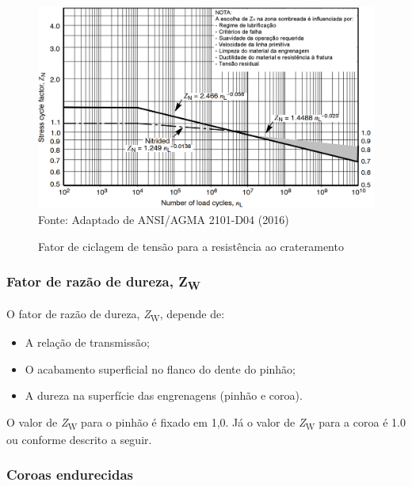\documentclass[12pt,a4paper]{article}
\providecommand{\tightlist}{\setlength{\itemsep}{0pt}\setlength{\parskip}{0pt}}%
\begin{document}
\begin{figure}[!htb]
    \centering
    \caption{Fator de ciclagem de tensão para a resistência ao crateramento}
    \includegraphics[scale=0.5]{Imagens/Img16.png}\\
    {\footnotesize Fonte: Adaptado de ANSI/AGMA 2101-D04 (2016)}
    \label{fig:16}
\end{figure}

\subsubsection*{\texorpdfstring{Fator de razão de dureza,
Z\textsubscript{W}}{Fator de razão de dureza, ZW}}

{\label{fator-de-razuxe3o-de-dureza-zw}}

O fator de razão de dureza, \emph{Z}\textsubscript{W}, depende de:

\begin{itemize}
\tightlist
\item
  A relação de transmissão;
\item
  O acabamento superficial no flanco do dente do pinhão;
\item
  A dureza na superfície das engrenagens (pinhão e coroa).
\end{itemize}

O valor de \emph{Z}\textsubscript{W} para o pinhão é fixado em 1,0. Já o
valor de \emph{Z}\textsubscript{W} para a coroa é 1.0 ou conforme
descrito a seguir.

\subsubsection*{Coroas endurecidas}

{\label{coroas-endurecidas}}
\end{document}
